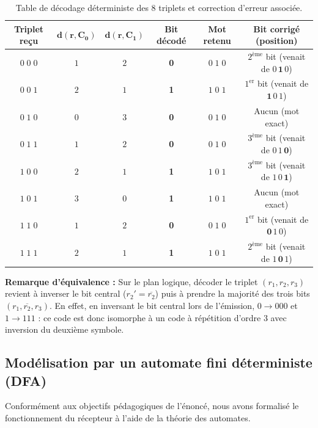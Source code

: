 \documentclass[a4paper,12pt]{report}
\begin{document}
\begin{table}[H]
\centering
\begin{tabular}{|c|c|c|c|c|c|}
\hline
\textbf{Triplet reçu} & $\mathbf{d(r, C_0)}$ & $\mathbf{d(r, C_1)}$ & \textbf{Bit décodé} & \textbf{Mot retenu} & \textbf{Bit corrigé (position)} \\
\hline
$0\;0\;0$ & $1$ & $2$ & \textbf{0} & $0\;1\;0$ & $2^{\text{ème}}$ bit (venait de $0\,\textbf{1}\,0$) \\
$0\;0\;1$ & $2$ & $1$ & \textbf{1} & $1\;0\;1$ & $1^{\text{er}}$ bit (venait de $\textbf{1}\,0\,1$) \\
$0\;1\;0$ & $0$ & $3$ & \textbf{0} & $0\;1\;0$ & Aucun (mot exact) \\
$0\;1\;1$ & $1$ & $2$ & \textbf{0} & $0\;1\;0$ & $3^{\text{ème}}$ bit (venait de $0\,1\,\textbf{0}$) \\
$1\;0\;0$ & $2$ & $1$ & \textbf{1} & $1\;0\;1$ & $3^{\text{ème}}$ bit (venait de $1\,0\,\textbf{1}$) \\
$1\;0\;1$ & $3$ & $0$ & \textbf{1} & $1\;0\;1$ & Aucun (mot exact) \\
$1\;1\;0$ & $1$ & $2$ & \textbf{0} & $0\;1\;0$ & $1^{\text{er}}$ bit (venait de $\textbf{0}\,1\,0$) \\
$1\;1\;1$ & $2$ & $1$ & \textbf{1} & $1\;0\;1$ & $2^{\text{ème}}$ bit (venait de $1\,\textbf{0}\,1$) \\
\hline
\end{tabular}
\caption{Table de décodage déterministe des 8 triplets et correction d'erreur associée.}
\label{tab:decodage_triplets}
\end{table}

\noindent \textbf{Remarque d'équivalence :} Sur le plan logique, décoder le triplet $(r_1, r_2, r_3)$ revient à inverser le bit central ($r_2' = \overline{r_2}$) puis à prendre la majorité des trois bits $(r_1, \overline{r_2}, r_3)$. En effet, en inversant le bit central lors de l'émission, $0 \to 000$ et $1 \to 111$ : ce code est donc isomorphe à un code à répétition d'ordre 3 avec inversion du deuxième symbole.

\subsection{Modélisation par un automate fini déterministe (DFA)}

Conformément aux objectifs pédagogiques de l'énoncé, nous avons formalisé le fonctionnement du récepteur à l'aide de la théorie des automates. 
\end{document}
